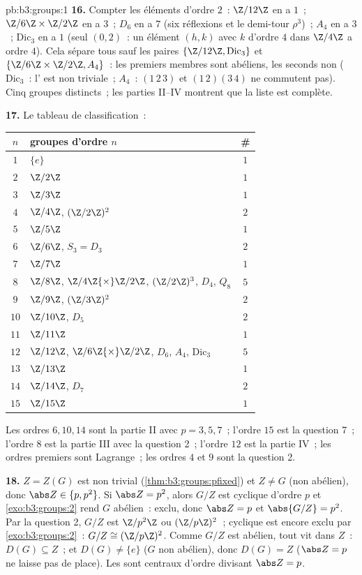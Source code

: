 \begin{solution}{pb:b3:groups:1}
\textbf{16.} Compter les éléments d'ordre $2$~: $\Z/12\Z$ en a
$1$~; $\Z/6\Z\times\Z/2\Z$ en a $3$~; $D_6$ en a $7$ (six
réflexions et le demi-tour $\rho^3$)~; $A_4$ en a $3$~;
$\mathrm{Dic}_3$ en a $1$ (seul $(0, 2)$~: un élément $(h, k)$
avec $k$ d'ordre $4$ dans $\Z/4\Z$ a ordre $4$). Cela sépare
tous sauf les paires $\{\Z/12\Z, \mathrm{Dic}_3\}$ et
$\{\Z/6\Z\times\Z/2\Z, A_4\}$~: les premiers membres sont
abéliens, les seconds non ($\mathrm{Dic}_3$~: l' est non
triviale~; $A_4$~: $(1\,2\,3)$ et $(1\,2)(3\,4)$ ne
commutent pas). Cinq groupes distincts~; les parties II--IV
montrent que la liste est complète.

\textbf{17.} Le tableau de classification~:
\begin{center}
\begin{tabular}{c l c}
$n$ & groupes d'ordre $n$ & \#\\
\hline
$1$ & $\{e\}$ & $1$\\
$2$ & $\Z/2\Z$ & $1$\\
$3$ & $\Z/3\Z$ & $1$\\
$4$ & $\Z/4\Z$, $(\Z/2\Z)^2$ & $2$\\
$5$ & $\Z/5\Z$ & $1$\\
$6$ & $\Z/6\Z$, $S_3 = D_3$ & $2$\\
$7$ & $\Z/7\Z$ & $1$\\
$8$ & $\Z/8\Z$, $\Z/4\Z{\times}\Z/2\Z$, $(\Z/2\Z)^3$, $D_4$,
      $Q_8$ & $5$\\
$9$ & $\Z/9\Z$, $(\Z/3\Z)^2$ & $2$\\
$10$ & $\Z/10\Z$, $D_5$ & $2$\\
$11$ & $\Z/11\Z$ & $1$\\
$12$ & $\Z/12\Z$, $\Z/6\Z{\times}\Z/2\Z$, $D_6$, $A_4$,
       $\mathrm{Dic}_3$ & $5$\\
$13$ & $\Z/13\Z$ & $1$\\
$14$ & $\Z/14\Z$, $D_7$ & $2$\\
$15$ & $\Z/15\Z$ & $1$\\
\end{tabular}
\end{center}
Les ordres $6, 10, 14$ sont la partie II avec $p = 3, 5, 7$~;
l'ordre $15$ est la question 7~; l'ordre $8$ est la partie III
avec la question 2~; l'ordre $12$ est la partie IV~; les ordres
premiers sont Lagrange~; les ordres $4$ et $9$ sont la question
2.

\textbf{18.} $Z = Z(G)$ est non trivial
(\cref{thm:b3:groups:pfixed}) et $Z \neq G$ (non abélien), donc
$\abs Z \in \{p, p^2\}$. Si $\abs Z = p^2$, alors $G/Z$ est
cyclique d'ordre $p$ et \cref{exo:b3:groups:2} rend $G$
abélien~: exclu, donc $\abs Z = p$ et $\abs{G/Z} = p^2$. Par la
question 2, $G/Z$ est $\Z/p^2\Z$ ou $(\Z/p\Z)^2$~; cyclique est
encore exclu par \cref{exo:b3:groups:2}~: $G/Z \cong
(\Z/p\Z)^2$. Comme $G/Z$ est abélien, tout  vit dans
$Z$~: $D(G) \subseteq Z$~; et $D(G) \neq \{e\}$ ($G$ non
abélien), donc $D(G) = Z$ ($\abs Z = p$ ne laisse pas de
place). Les  sont centraux d'ordre divisant $\abs Z
= p$.


\end{solution}
